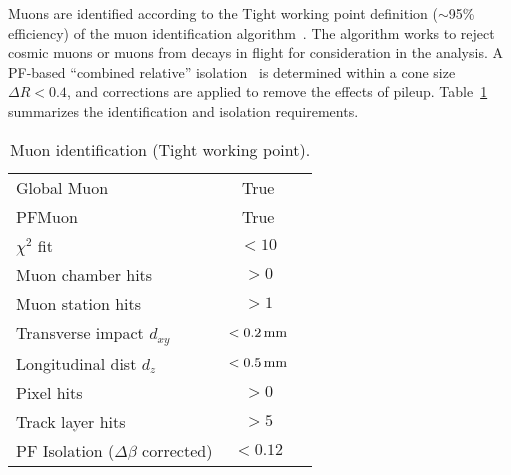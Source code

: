 Muons are identified according to the Tight working point definition
($\sim$95\% efficiency) of the muon identification
algorithm~\cite{ref:muon-id}. The algorithm works to reject cosmic muons or 
muons from decays in flight for consideration in the analysis. 
A PF-based ``combined relative'' isolation~\cite{ref:muon-id} is determined 
within a cone size $\Delta R < 0.4$, and corrections are applied to 
remove the effects of pileup. Table~\ref{tab:muon-id} summarizes the
identification and isolation requirements. 

\begin{table}[h!]
  \caption{Muon identification (Tight working point).\label{tab:muon-id}}
  \centering
  \footnotesize
  \begin{tabular}{ lcc }
    \hline
    \hline
    Global Muon                            & True       \\        
    PFMuon                                 & True       \\
    $\chi^{2}$ fit                         & $<10$      \\
    Muon chamber hits                      & $>0$       \\
    Muon station hits                      & $>1$       \\
    Transverse impact $d_{xy}$             & $<0.2\,\text{mm}$  \\
    Longitudinal dist $d_{z}$              & $<0.5\,\text{mm}$  \\
    Pixel hits                             & $>0$       \\
    Track layer hits                       & $>5$       \\
    PF Isolation ($\Delta\beta$ corrected) & $<0.12$    \\
    \hline
    \hline
  \end{tabular}
\end{table}

